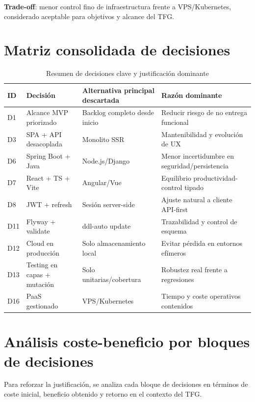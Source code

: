 \textbf{Trade-off}:
menor control fino de infraestructura frente a VPS/Kubernetes,
considerado aceptable para objetivos y alcance del TFG.

\FloatBarrier
\section{Matriz consolidada de decisiones}

\begin{table}[!htbp]
\centering
\begin{tabular}{|P{1.6cm}|P{3.8cm}|P{3.2cm}|P{4.4cm}|}
\hline
\textbf{ID} & \textbf{Decisi\'on} & \textbf{Alternativa principal descartada} & \textbf{Raz\'on dominante} \\
\hline
D1 & Alcance MVP priorizado & Backlog completo desde inicio & Reducir riesgo de no entrega funcional \\
\hline
D3 & SPA + API desacoplada & Monolito SSR & Mantenibilidad y evoluci\'on de UX \\
\hline
D6 & Spring Boot + Java & Node.js/Django & Menor incertidumbre en seguridad/persistencia \\
\hline
D7 & React + TS + Vite & Angular/Vue & Equilibrio productividad-control tipado \\
\hline
D8 & JWT + refresh & Sesi\'on server-side & Ajuste natural a cliente API-first \\
\hline
D11 & Flyway + validate & ddl-auto update & Trazabilidad y control de esquema \\
\hline
D12 & Cloud en producci\'on & Solo almacenamiento local & Evitar p\'erdida en entornos ef\'imeros \\
\hline
D13 & Testing en capas + mutaci\'on & Solo unitarias/cobertura & Robustez real frente a regresiones \\
\hline
D16 & PaaS gestionado & VPS/Kubernetes & Tiempo y coste operativos contenidos \\
\hline
\end{tabular}
\caption{Resumen de decisiones clave y justificaci\'on dominante}
\label{tab:resumen-decisiones}
\end{table}

\FloatBarrier
\section{An\'alisis coste-beneficio por bloques de decisiones}

Para reforzar la justificaci\'on,
se analiza cada bloque de decisiones en t\'erminos de coste inicial,
beneficio obtenido y retorno en el contexto del TFG.

